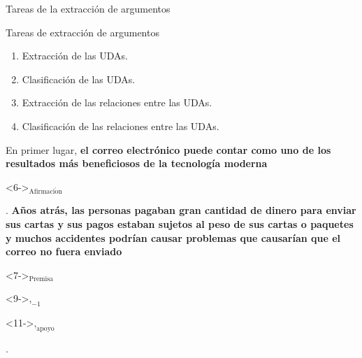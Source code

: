 \documentclass{beamer}
\begin{document}
\begin{frame}{Tareas de la extracción de argumentos}

    \begin{block}{Tareas de extracción de argumentos}
        \begin{enumerate}
            \item<2-> Extracción de las UDAs.
            \item<5-> Clasificación de las UDAs.
            \item<8-> Extracción de las relaciones entre las UDAs.
            \item<10-> Clasificación de las relaciones entre las UDAs.
        \end{enumerate}
    \end{block}

    En primer lugar, \only<3->{[}\textbf<3->{el correo electrónico puede contar como uno de los resultados
    más beneficiosos de la tecnología moderna}\only<3->{]}\begin{onlyenv}<6->{$_{\mathrm{Afirmaci\acute{o}n}}$}\end{onlyenv}. 
    \only<4->{[}\textbf<4->{Años atrás, las personas pagaban gran cantidad de dinero para 
    enviar sus cartas y sus pagos estaban sujetos al peso de sus cartas o paquetes y muchos accidentes 
    podrían causar problemas que causarían que el correo no fuera enviado}\only<4->{]}\begin{onlyenv}<7->{$_{\mathrm{Premisa}}$}\end{onlyenv}\begin{onlyenv}<9->{$, _{-1}$}\end{onlyenv}\begin{onlyenv}<11->{$, _{\mathrm{apoyo}}$}\end{onlyenv}.

\end{frame}
\end{document}
